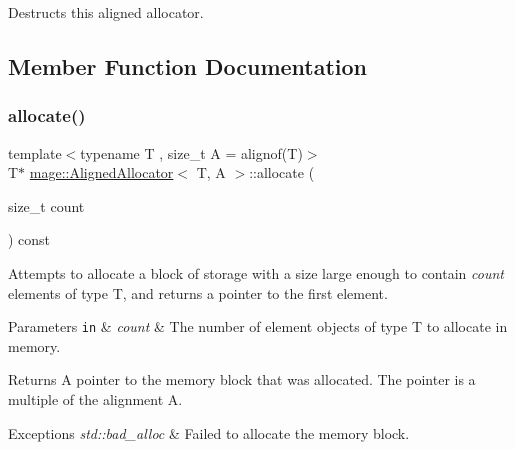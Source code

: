 Destructs this aligned allocator. 

\subsection{Member Function Documentation}
\mbox{\label{classmage_1_1_aligned_allocator_a62d718a737dd6f436d086b626f9ab519}} 
\subsubsection{\texorpdfstring{allocate()}{allocate()}\hspace{0.1cm}{\footnotesize\ttfamily [1/2]}}
{\footnotesize\ttfamily template$<$typename T , size\+\_\+t A = alignof(\+T)$>$ \\
T$\ast$ \mbox{\hyperlink{classmage_1_1_aligned_allocator}{mage\+::\+Aligned\+Allocator}}$<$ T, A $>$\+::allocate (\begin{DoxyParamCaption}\item[{size\+\_\+t}]{count }\end{DoxyParamCaption}) const}

Attempts to allocate a block of storage with a size large enough to contain {\itshape count} elements of type {\ttfamily T}, and returns a pointer to the first element.


\begin{DoxyParams}[1]{Parameters}
\mbox{\tt in}  & {\em count} & The number of element objects of type {\ttfamily T} to allocate in memory. \\
\hline
\end{DoxyParams}
\begin{DoxyReturn}{Returns}
A pointer to the memory block that was allocated. The pointer is a multiple of the alignment {\ttfamily A}. 
\end{DoxyReturn}

\begin{DoxyExceptions}{Exceptions}
{\em std\+::bad\+\_\+alloc} & Failed to allocate the memory block. \\
\hline
\end{DoxyExceptions}
\mbox{\label{classmage_1_1_aligned_allocator_a12f2a6829d8d88dceeffea4363c95088}} 
